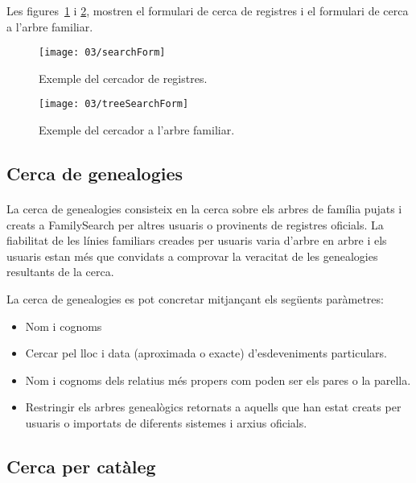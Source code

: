         Les figures~\ref{fig:fsSearcher} i \ref{fig:treeSearcher}, mostren el formulari de cerca de registres i el formulari de cerca a l'arbre familiar.

        \begin{figure}[h]
            \texttt{[image: 03/searchForm]}
            \centering
            \caption{Exemple del cercador de registres.\label{fig:fsSearcher}}
        \end{figure}

        \begin{figure}[h]
            \texttt{[image: 03/treeSearchForm]}
            \centering
            \caption{Exemple del cercador a l'arbre familiar.\label{fig:treeSearcher}}
        \end{figure}


    \subsection{Cerca de genealogies}

        \paragraph{}
        La cerca de genealogies consisteix en la cerca sobre els arbres de família pujats i creats a FamilySearch per altres usuaris o provinents de registres oficials. La fiabilitat de les línies familiars creades per usuaris varia d’arbre en arbre i els usuaris estan més que convidats a comprovar la veracitat de les genealogies resultants de la cerca.

        La cerca de genealogies es pot concretar mitjançant els següents paràmetres:

        \begin{itemize}
            \item Nom i cognoms
            \item Cercar pel lloc i data (aproximada o exacte) d’esdeveniments particulars.
            \item Nom i cognoms dels relatius més propers com poden ser els pares o la parella.
            \item Restringir els arbres genealògics retornats a aquells que han estat creats per usuaris o importats de diferents sistemes i arxius oficials.
        \end{itemize}


    \subsection{Cerca per catàleg}

